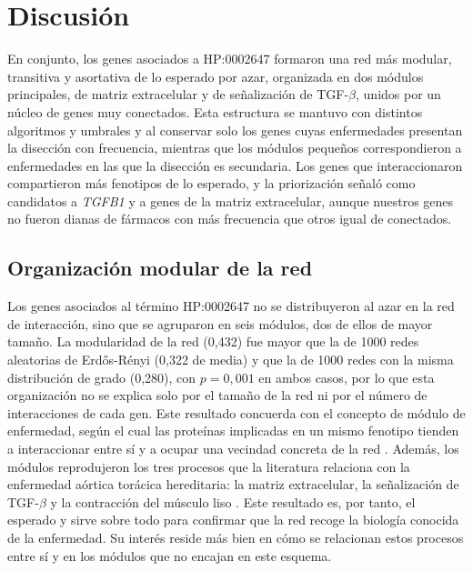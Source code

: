 \section{Discusión}

En conjunto, los genes asociados a HP:0002647 formaron una red más modular, transitiva y asortativa de lo esperado por azar, organizada en dos módulos principales, de matriz extracelular y de señalización de TGF-$\beta$, unidos por un núcleo de genes muy conectados. Esta estructura se mantuvo con distintos algoritmos y umbrales y al conservar solo los genes cuyas enfermedades presentan la disección con frecuencia, mientras que los módulos pequeños correspondieron a enfermedades en las que la disección es secundaria. Los genes que interaccionaron compartieron más fenotipos de lo esperado, y la priorización señaló como candidatos a \textit{TGFB1} y a genes de la matriz extracelular, aunque nuestros genes no fueron dianas de fármacos con más frecuencia que otros igual de conectados.

\subsection{Organización modular de la red}

Los genes asociados al término HP:0002647 no se distribuyeron al azar en la red de interacción, sino que se agruparon en seis módulos, dos de ellos de mayor tamaño. La modularidad de la red (0,432) fue mayor que la de 1000 redes aleatorias de Erd\H{o}s-R\'enyi (0,322 de media) y que la de 1000 redes con la misma distribución de grado (0,280), con $p = 0{,}001$ en ambos casos, por lo que esta organización no se explica solo por el tamaño de la red ni por el número de interacciones de cada gen. Este resultado concuerda con el concepto de módulo de enfermedad, según el cual las proteínas implicadas en un mismo fenotipo tienden a interaccionar entre sí y a ocupar una vecindad concreta de la red \cite{Barabasi2011}. Además, los módulos reprodujeron los tres procesos que la literatura relaciona con la enfermedad aórtica torácica hereditaria: la matriz extracelular, la señalización de TGF-$\beta$ y la contracción del músculo liso \cite{Pinard2019,Lindsay2011}. Este resultado es, por tanto, el esperado y sirve sobre todo para confirmar que la red recoge la biología conocida de la enfermedad. Su interés reside más bien en cómo se relacionan estos procesos entre sí y en los módulos que no encajan en este esquema.

